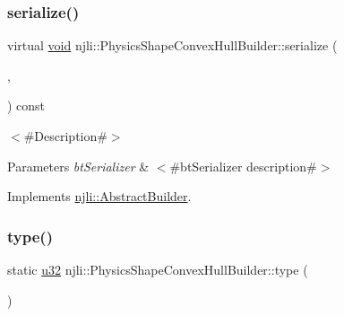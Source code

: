 \mbox{\label{classnjli_1_1_physics_shape_convex_hull_builder_a10dc63611b53d78494287ecca38fe3dc}} 
\subsubsection{\texorpdfstring{serialize()}{serialize()}}
{\footnotesize\ttfamily virtual \mbox{\hyperlink{_thread_8h_af1e856da2e658414cb2456cb6f7ebc66}{void}} njli\+::\+Physics\+Shape\+Convex\+Hull\+Builder\+::serialize (\begin{DoxyParamCaption}\item[{\mbox{\hyperlink{_thread_8h_af1e856da2e658414cb2456cb6f7ebc66}{void}} $\ast$}]{,  }\item[{bt\+Serializer $\ast$}]{ }\end{DoxyParamCaption}) const\hspace{0.3cm}{\ttfamily [virtual]}}

$<$\#\+Description\#$>$


\begin{DoxyParams}{Parameters}
{\em bt\+Serializer} & $<$\#bt\+Serializer description\#$>$ \\
\hline
\end{DoxyParams}


Implements \mbox{\hyperlink{classnjli_1_1_abstract_builder_ab66b774e02ccb9da554c9aab7fa6d981}{njli\+::\+Abstract\+Builder}}.

\mbox{\label{classnjli_1_1_physics_shape_convex_hull_builder_aad6a6c1a62f556a45dbee87c8a4ac9ee}} 
\subsubsection{\texorpdfstring{type()}{type()}}
{\footnotesize\ttfamily static \mbox{\hyperlink{_util_8h_a10e94b422ef0c20dcdec20d31a1f5049}{u32}} njli\+::\+Physics\+Shape\+Convex\+Hull\+Builder\+::type (\begin{DoxyParamCaption}{ }\end{DoxyParamCaption})\hspace{0.3cm}{\ttfamily [static]}}


